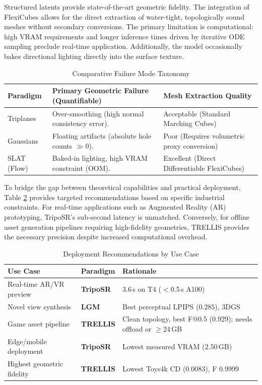 \documentclass[10pt, conference]{IEEEtran}
\begin{document}
Structured latents provide state-of-the-art geometric fidelity. The integration of FlexiCubes allows for the direct extraction of water-tight, topologically sound meshes without secondary conversions. The primary limitation is computational: high VRAM requirements and longer inference times driven by iterative ODE sampling preclude real-time application. Additionally, the model occasionally bakes directional lighting directly into the surface texture.

\begin{table}[ht]
\centering
\caption{Comparative Failure Mode Taxonomy}
\label{tab:failure_modes}
\begin{tabular}{>{\raggedright\arraybackslash}p{1.5cm} >{\raggedright\arraybackslash}p{3.5cm} >{\raggedright\arraybackslash}p{2.5cm}}
\toprule
\textbf{Paradigm} & \textbf{Primary Geometric Failure (Quantifiable)} & \textbf{Mesh Extraction Quality} \\
\midrule
Triplanes & Over-smoothing (high normal consistency error). & Acceptable (Standard Marching Cubes) \\
\midrule
Gaussians & Floating artifacts (absolute hole counts $\gg 0$). & Poor (Requires volumetric proxy conversion) \\
\midrule
SLAT (Flow) & Baked-in lighting, high VRAM constraint (OOM). & Excellent (Direct Differentiable FlexiCubes) \\
\bottomrule
\end{tabular}
\end{table}

To bridge the gap between theoretical capabilities and practical deployment, Table \ref{tab:deployment} provides targeted recommendations based on specific industrial constraints. For real-time applications such as Augmented Reality (AR) prototyping, TripoSR's sub-second latency is unmatched. Conversely, for offline asset generation pipelines requiring high-fidelity geometries, TRELLIS provides the necessary precision despite increased computational overhead.

\begin{table}[ht]
\centering
\caption{Deployment Recommendations by Use Case}
\label{tab:deployment}
\begin{tabular}{>{\raggedright\arraybackslash}p{2.6cm} l >{\raggedright\arraybackslash}p{3.2cm}}
\toprule
\textbf{Use Case} & \textbf{Paradigm} & \textbf{Rationale} \\
\midrule
Real-time AR/VR preview & \textbf{TripoSR} & $3.6$\,s on T4 ($<$0.5\,s A100) \\
Novel view synthesis & \textbf{LGM} & Best perceptual LPIPS ($0.285$), 3DGS \\
Game asset pipeline & \textbf{TRELLIS} & Clean topology, best F@0.5 (0.929); needs offload or $\ge$24\,GB \\
Edge/mobile deployment & \textbf{TripoSR} & Lowest measured VRAM ($2.50$\,GB) \\
Highest geometric fidelity & \textbf{TRELLIS} & Lowest Toys4k CD (0.0083), F 0.9999 \\
\bottomrule
\end{tabular}
\end{table}
\end{document}
